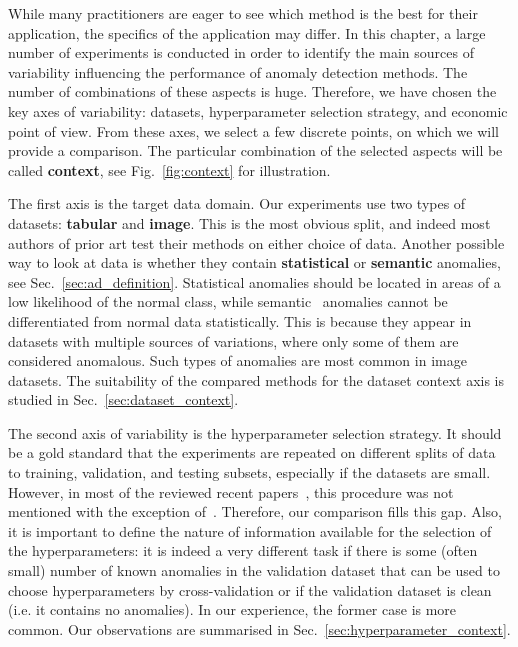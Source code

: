 While many practitioners are eager to see which method is the best for their application, the specifics of the application may differ. In this chapter, a large number of experiments is conducted in order to identify the main sources of variability influencing the performance of anomaly detection methods. The number of combinations of these aspects is huge. Therefore, we have chosen the key axes of variability: datasets, hyperparameter selection strategy, and economic point of view. From these axes, we select a few discrete points, on which we will provide a comparison. The particular combination of the selected aspects will be called \textbf{context}, see Fig.~\ref{fig:context} for illustration. 

The first axis is the target data domain. Our experiments use two types of datasets: \textbf{tabular} and \textbf{image}. This is the most obvious split, and indeed most authors of prior art test their methods on either choice of data. Another possible way to look at data is whether they contain \textbf{statistical} or \textbf{semantic} anomalies, see Sec.~\ref{sec:ad_definition}. Statistical anomalies should be located in areas of a low likelihood of the normal class, while semantic~\cite{ahmed2020detecting} anomalies cannot be differentiated from normal data statistically. This is because they appear in datasets with multiple sources of variations, where only some of them are considered anomalous. Such types of anomalies are most common in image datasets. The suitability of the compared methods for the dataset context axis is studied in Sec.~\ref{sec:dataset_context}.

The second axis of variability is the hyperparameter selection strategy. It should be a gold standard that the experiments are repeated on different splits of data to training, validation, and testing subsets, especially if the datasets are small. However, in most of the reviewed recent papers~\cite{liu2019generative,wang2020advae,schlegl2017unsupervised, akcay2018ganomaly, perera2019ocgan}, this procedure was not mentioned with the exception of~\cite{ruff2018deep}. Therefore, our comparison fills this gap. Also, it is important to define the nature of information available for the selection of the hyperparameters: it is indeed a very different task if there is some (often small) number of known anomalies in the validation dataset that can be used to choose hyperparameters by cross-validation or if the validation dataset is clean (i.e. it contains no anomalies). In our experience, the former case is more common. Our observations are summarised in Sec.~\ref{sec:hyperparameter_context}.


